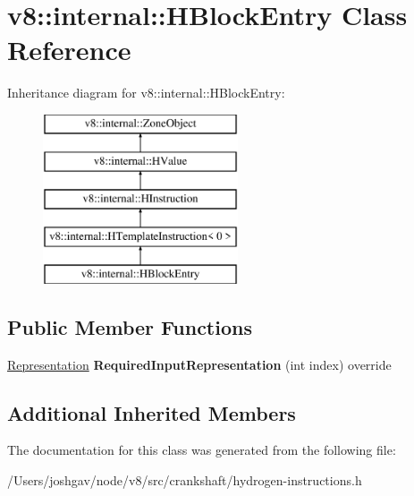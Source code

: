 \hypertarget{classv8_1_1internal_1_1_h_block_entry}{}\section{v8\+:\+:internal\+:\+:H\+Block\+Entry Class Reference}
\label{classv8_1_1internal_1_1_h_block_entry}
Inheritance diagram for v8\+:\+:internal\+:\+:H\+Block\+Entry\+:\begin{figure}[H]
\begin{center}
\leavevmode
\includegraphics[height=5.000000cm]{classv8_1_1internal_1_1_h_block_entry}
\end{center}
\end{figure}
\subsection*{Public Member Functions}
\begin{DoxyCompactItemize}
\item 
\hyperlink{classv8_1_1internal_1_1_representation}{Representation} {\bfseries Required\+Input\+Representation} (int index) override\hypertarget{classv8_1_1internal_1_1_h_block_entry_a6ed52da635d80340dd8dbecd536547bc}{}\label{classv8_1_1internal_1_1_h_block_entry_a6ed52da635d80340dd8dbecd536547bc}

\end{DoxyCompactItemize}
\subsection*{Additional Inherited Members}


The documentation for this class was generated from the following file\+:\begin{DoxyCompactItemize}
\item 
/\+Users/joshgav/node/v8/src/crankshaft/hydrogen-\/instructions.\+h\end{DoxyCompactItemize}
